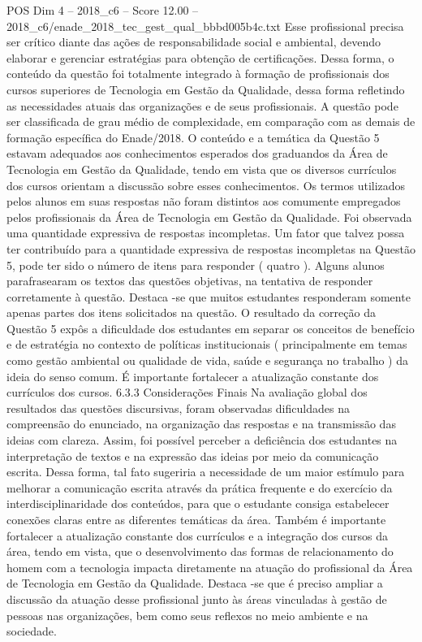 \begin{textsample}{POS Dim 4 – 2018\_c6 – Score 12.00 – 2018\_c6/enade\_2018\_tec\_gest\_qual\_bbbd005b4c.txt}
Esse profissional precisa ser crítico diante das ações de responsabilidade social e ambiental, devendo elaborar e gerenciar estratégias para obtenção de certificações.
Dessa forma, o conteúdo da questão foi totalmente integrado à formação de profissionais dos cursos superiores de Tecnologia em Gestão da Qualidade, dessa forma refletindo as necessidades atuais das organizações e de seus profissionais.
A questão pode ser classificada de grau médio de complexidade, em comparação com as demais de formação específica do Enade/2018.
O conteúdo e a temática da Questão 5 estavam adequados aos conhecimentos esperados dos graduandos da Área de Tecnologia em Gestão da Qualidade, tendo em vista que os diversos currículos dos cursos orientam a discussão sobre esses conhecimentos.
Os termos utilizados pelos alunos em suas respostas não foram distintos aos comumente empregados pelos profissionais da Área de Tecnologia em Gestão da Qualidade.
Foi observada uma quantidade expressiva de respostas incompletas.
Um fator que talvez possa ter contribuído para a quantidade expressiva de respostas incompletas na Questão 5, pode ter sido o número de itens para responder ( quatro ).
Alguns alunos parafrasearam os textos das questões objetivas, na tentativa de responder corretamente à questão.
Destaca -se que muitos estudantes responderam somente apenas partes dos itens solicitados na questão.
O resultado da correção da Questão 5 expôs a dificuldade dos estudantes em separar os conceitos de benefício e de estratégia no contexto de políticas institucionais ( principalmente em temas como gestão ambiental ou qualidade de vida, saúde e segurança no trabalho ) da ideia do senso comum.
É importante fortalecer a atualização constante dos currículos dos cursos. 6.3.3 Considerações Finais Na avaliação global dos resultados das questões discursivas, foram observadas dificuldades na compreensão do enunciado, na organização das respostas e na transmissão das ideias com clareza.
Assim, foi possível perceber a deficiência dos estudantes na interpretação de textos e na expressão das ideias por meio da comunicação escrita.
Dessa forma, tal fato sugeriria a necessidade de um maior estímulo para melhorar a comunicação escrita através da prática frequente e do exercício da interdisciplinaridade dos conteúdos, para que o estudante consiga estabelecer conexões claras entre as diferentes temáticas da área.
Também é importante fortalecer a atualização constante dos currículos e a integração dos cursos da área, tendo em vista, que o desenvolvimento das formas de relacionamento do homem com a tecnologia impacta diretamente na atuação do profissional da Área de Tecnologia em Gestão da Qualidade.
Destaca -se que é preciso ampliar a discussão da atuação desse profissional junto às áreas vinculadas à gestão de pessoas nas organizações, bem como seus reflexos no meio ambiente e na sociedade.

\end{textsample}
